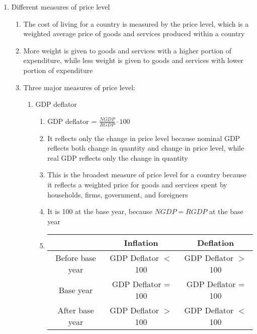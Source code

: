 \documentclass[12pt]{article}
\begin{document}
\begin{enumerate}
\begin{enumerate}
        \end{enumerate}

      \item Different measures of price level

        \begin{enumerate}

          \item The cost of living for a country is measured by the price level, which is a weighted average price of goods and services produced within a country

          \item More weight is given to goods and services with a higher portion of expenditure, while less weight is given to goods and services with lower portion of expenditure

          \item Three major measures of price level:

            \begin{enumerate}

              \item GDP deflator

                \begin{enumerate}

                  \item GDP deflator = $\frac{NGDP}{RGDP}\cdot100$

                  \item It reflects only the change in price level because nominal GDP reflects both change in quantity and change in price level, while real GDP reflects only the change in quantity

                  \item This is the broadest measure of price level for a country because it reflects a weighted price for goods and services spent by households, firms, government, and foreigners

                  \item It is 100 at the base year, because $NGDP = RGDP$ at the base year

                  \item \begin{tabular}{|c|c|c|} \hline & Inflation & Deflation\\ \hline Before base year & GDP Deflator $<$ 100 & GDP Deflator $>$ 100\\ \hline Base year & GDP Deflator = 100 & GDP Deflator = 100\\ \hline After base year & GDP Deflator $>$ 100 & GDP Deflator $<$ 100\\\hline  \end{tabular}


\end{enumerate}
\end{enumerate}
\end{enumerate}
\end{enumerate}
\end{document}
